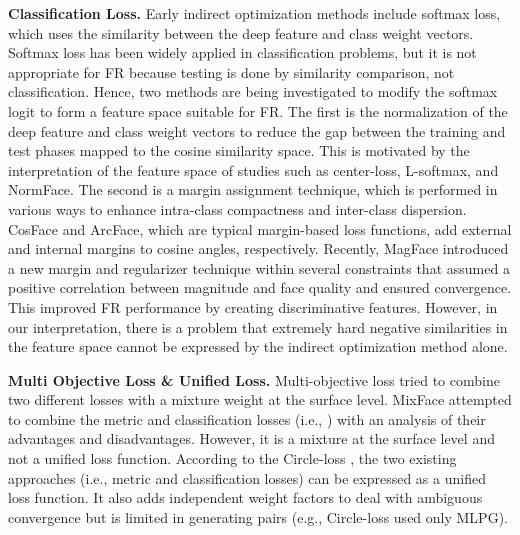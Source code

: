 \documentclass[10pt,twocolumn]{article}
\begin{document}
\noindent\textbf{Classification Loss.} Early indirect optimization methods include softmax loss\cite{cao2018vggface2,deepface-recognition,taigman2014deepface}, which uses the similarity between the deep feature and class weight vectors. Softmax loss has been widely applied in classification problems, but it is not appropriate for FR because testing is done by similarity comparison, not classification. Hence, two methods are being investigated to modify the softmax logit to form a feature space suitable for FR. The first is the normalization of the deep feature and class weight vectors\cite{ranjan2017l2, wang2018cosface, wang2018additive} to reduce the gap between the training and test phases mapped to the cosine similarity space. This is motivated by the interpretation of the feature space of studies such as center-loss\cite{wen2016discriminative}, L-softmax\cite{liu2016large}, and NormFace\cite{wang2017normface}. The second is a margin assignment technique\cite{liu2017sphereface, wang2018cosface, wang2018additive, deng2019arcface, meng2021magface}, which is performed in various ways to enhance intra-class compactness and inter-class dispersion. CosFace\cite{wang2018cosface} and ArcFace\cite{deng2019arcface}, which are typical margin-based loss functions, add external and internal margins to cosine angles, respectively. Recently, MagFace\cite{meng2021magface} introduced a new margin and regularizer technique within several constraints that assumed a positive correlation between magnitude and face quality and ensured convergence. This improved FR performance by creating discriminative features. However, in our interpretation, there is a problem that extremely hard negative similarities in the feature space cannot be expressed by the indirect optimization method alone.

\noindent\textbf{Multi Objective Loss \& Unified Loss.}
Multi-objective loss tried to combine two different losses with a mixture weight at the surface level. MixFace\cite{jung2021mixface} attempted to combine the metric and classification losses (i.e., ) with an analysis of their advantages and disadvantages. However, it is a mixture at the surface level and not a unified loss function. According to the Circle-loss \cite{sun2020circle}, the two existing approaches (i.e., metric and classification losses) can be expressed as a unified loss function. It also adds independent weight factors to deal with ambiguous convergence but is limited in generating pairs (e.g., Circle-loss\cite{sun2020circle} used only MLPG).
\end{document}
